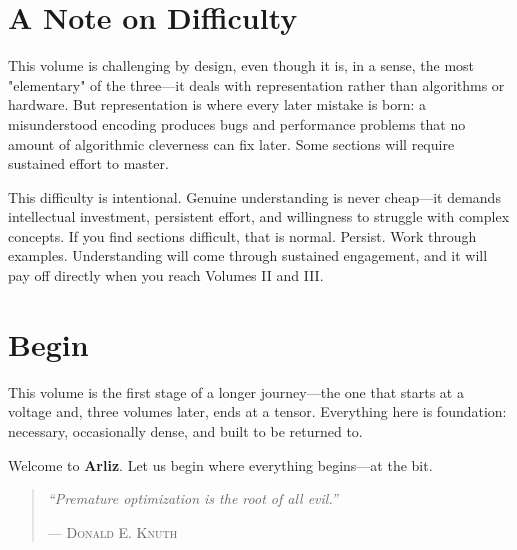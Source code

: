\section*{A Note on Difficulty}

This volume is challenging by design, even though it is, in a sense, the most "elementary" of the three---it deals with representation rather than algorithms or hardware. But representation is where every later mistake is born: a misunderstood encoding produces bugs and performance problems that no amount of algorithmic cleverness can fix later. Some sections will require sustained effort to master.

This difficulty is intentional. Genuine understanding is never cheap---it demands intellectual investment, persistent effort, and willingness to struggle with complex concepts. If you find sections difficult, that is normal. Persist. Work through examples. Understanding will come through sustained engagement, and it will pay off directly when you reach Volumes II and III.

\section*{Begin}

This volume is the first stage of a longer journey---the one that starts at a voltage and, three volumes later, ends at a tensor. Everything here is foundation: necessary, occasionally dense, and built to be returned to.

Welcome to \textbf{Arliz}. Let us begin where everything begins---at the bit.

\vfill

\begin{quote}
\textit{``Premature optimization is the root of all evil.''}

\hfill--- \textsc{Donald E. Knuth}
\end{quote}

\clearpage